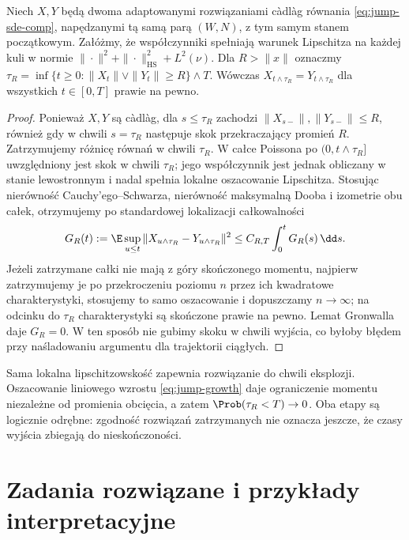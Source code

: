 \begin{lemat}
\label{lem:jump-exit-audit}
Niech $X,Y$ będą dwoma adaptowanymi rozwiązaniami càdlàg
równania \eqref{eq:jump-sde-comp}, napędzanymi tą samą parą
$(W,N)$, z tym samym stanem początkowym. Załóżmy, że
współczynniki spełniają warunek Lipschitza na każdej kuli
w normie $\|\cdot\|^2+\|\cdot\|_{\mathrm{HS}}^2+L^2(\nu)$.
Dla $R>\|x\|$ oznaczmy
$\tau_R=\inf\{t\ge0:\|X_t\|\vee\|Y_t\|\ge R\}\wedge T$.
Wówczas $X_{t\wedge\tau_R}=Y_{t\wedge\tau_R}$ dla
wszystkich $t\in[0,T]$ prawie na pewno.
\end{lemat}
\begin{proof}
Ponieważ $X,Y$ są càdlàg, dla $s\le\tau_R$ zachodzi
$\|X_{s-}\|,\|Y_{s-}\|\le R$, również gdy w chwili
$s=\tau_R$ następuje skok przekraczający promień $R$.
Zatrzymujemy różnicę równań w chwili $\tau_R$. W całce
Poissona po $(0,t\wedge\tau_R]$ uwzględniony jest skok
w chwili $\tau_R$; jego współczynnik jest jednak obliczany
w stanie lewostronnym i nadal spełnia lokalne oszacowanie
Lipschitza. Stosując nierówność Cauchy'ego--Schwarza,
nierówność maksymalną Dooba i izometrie obu całek,
otrzymujemy po standardowej lokalizacji całkowalności
\[
 G_R(t):=\E\sup_{u\le t}
 \|X_{u\wedge\tau_R}-Y_{u\wedge\tau_R}\|^2
 \le C_{R,T}\int_0^t G_R(s)\,\dd s.
\]
Jeżeli zatrzymane całki nie mają z góry skończonego
momentu, najpierw zatrzymujemy je po przekroczeniu poziomu
$n$ przez ich kwadratowe charakterystyki, stosujemy to samo
oszacowanie i dopuszczamy $n\to\infty$; na odcinku do
$\tau_R$ charakterystyki są skończone prawie na pewno.
Lemat Gronwalla daje $G_R=0$. W ten sposób nie gubimy
skoku w chwili wyjścia, co byłoby błędem przy
naśladowaniu argumentu dla trajektorii ciągłych.
\end{proof}

\begin{uwaga}
Sama lokalna lipschitzowskość zapewnia rozwiązanie do chwili
eksplozji. Oszacowanie liniowego wzrostu
\eqref{eq:jump-growth} daje ograniczenie momentu niezależne
od promienia obcięcia, a zatem $\Prob(\tau_R<T)\to0$.
Oba etapy są logicznie odrębne: zgodność rozwiązań
zatrzymanych nie oznacza jeszcze, że czasy wyjścia
zbiegają do nieskończoności.
\end{uwaga}

\section{Zadania rozwiązane i przykłady interpretacyjne}

